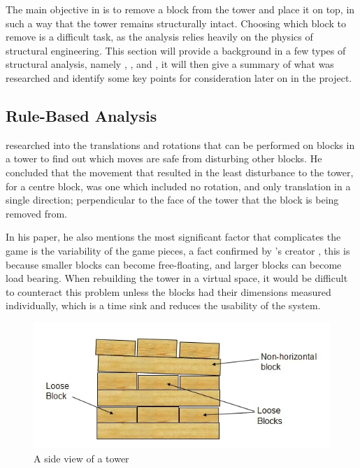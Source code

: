 The main objective in \jenga{} is to remove a block from the tower and place it on top, in such a way that the tower remains structurally intact. Choosing which block to remove is a difficult task, as the analysis relies heavily on the physics of structural engineering. This section will provide a background in a few types of structural analysis, namely , , and , it will then give a summary of what was researched and identify some key points for consideration later on in the project.


\subsection{Rule-Based Analysis}\label{subsec:rulebased}

\citet{jengaanalysis} researched into the translations and rotations that can be performed on \jenga{} blocks in a tower to find out which moves are safe from disturbing other blocks. He concluded that the movement that resulted in the least disturbance to the tower, for a centre block, was one which included no rotation, and only translation in a single direction; perpendicular to the face of the tower that the block is being removed from.

In his paper, he also mentions the most significant factor that complicates the game is the variability of the game pieces, a fact confirmed by \jenga{}'s creator \citep{jengacreator}, this is because smaller blocks can become free-floating, and larger blocks can become load bearing. When rebuilding the tower in a virtual space, it would be difficult to counteract this problem unless the blocks had their dimensions measured individually, which is a time sink and reduces the usability of the system.

\begin{figure}[ht]
    \centering
    \includegraphics[width=.8\linewidth]{images/litreview/jenga-different-sizes}
    \caption{A side view of a \jenga{} tower \protect\citep{south2003real}}
    \label{fig:jengasizes}
\end{figure}

